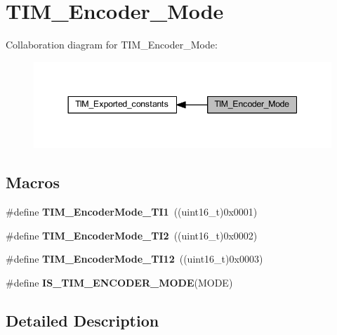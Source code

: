\hypertarget{group___t_i_m___encoder___mode}{}\section{T\+I\+M\+\_\+\+Encoder\+\_\+\+Mode}
\label{group___t_i_m___encoder___mode}
Collaboration diagram for T\+I\+M\+\_\+\+Encoder\+\_\+\+Mode\+:\nopagebreak
\begin{figure}[H]
\begin{center}
\leavevmode
\includegraphics[width=344pt]{group___t_i_m___encoder___mode}
\end{center}
\end{figure}
\subsection*{Macros}
\begin{DoxyCompactItemize}
\item 
\mbox{\label{group___t_i_m___encoder___mode_gabc63e3617a938382f87439ec58768b8e}} 
\#define {\bfseries T\+I\+M\+\_\+\+Encoder\+Mode\+\_\+\+T\+I1}~((uint16\+\_\+t)0x0001)
\item 
\mbox{\label{group___t_i_m___encoder___mode_ga5627a2d5d47b7301c7dbb29d20ae00e3}} 
\#define {\bfseries T\+I\+M\+\_\+\+Encoder\+Mode\+\_\+\+T\+I2}~((uint16\+\_\+t)0x0002)
\item 
\mbox{\label{group___t_i_m___encoder___mode_ga12511f903de08f1a634ff7828757f081}} 
\#define {\bfseries T\+I\+M\+\_\+\+Encoder\+Mode\+\_\+\+T\+I12}~((uint16\+\_\+t)0x0003)
\item 
\#define {\bfseries I\+S\+\_\+\+T\+I\+M\+\_\+\+E\+N\+C\+O\+D\+E\+R\+\_\+\+M\+O\+DE}(M\+O\+DE)
\end{DoxyCompactItemize}


\subsection{Detailed Description}



